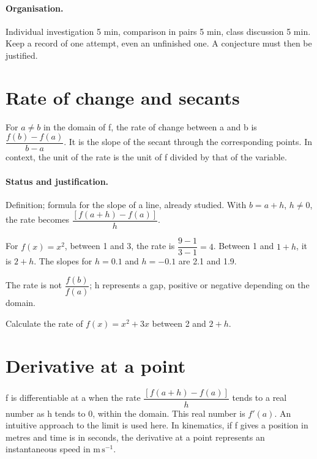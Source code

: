 \paragraph{Organisation.} Individual investigation 5 min, comparison in pairs 5 min, class discussion 5 min. Keep a record of one attempt, even an unfinished one. A conjecture must then be justified.
\mxnewpage
\section{Rate of change and secants}\label{C04-U1}
\begin{keypoint}
For $a\ne b$ in the domain of f, the rate of change between a and b is $\dfrac{f(b)-f(a)}{b-a}$. It is the slope of the secant through the corresponding points. In context, the unit of the rate is the unit of f divided by that of the variable.
\end{keypoint}
\paragraph{Status and justification.} Definition; formula for the slope of a line, already studied. With $b=a+h$, $h\ne0$, the rate becomes $\dfrac{[f(a+h)-f(a)]}{h}$.
\begin{example}For $f(x)=x^2$, between 1 and 3, the rate is $\dfrac{9-1}{3-1}=4$. Between 1 and $1+h$, it is $2+h$. The slopes for $h=\num{0,1}$ and $h=-\num{0,1}$ are \num{2,1} and \num{1,9}.\end{example}\label{C04-EX1}
\begin{pitfall}The rate is not $\dfrac{f(b)}{f(a)}$; h represents a gap, positive or negative depending on the domain.\end{pitfall}
\begin{application}Calculate the rate of $f(x)=x^2+3x$ between 2 and $2+h$.\end{application}\label{C04-AP1}
\section{Derivative at a point}\label{C04-U2}
\begin{keypoint}
f is differentiable at a when the rate $\dfrac{[f(a+h)-f(a)]}{h}$ tends to a real number as h tends to 0, within the domain. This real number is $f\prime(a)$. An intuitive approach to the limit is used here. In kinematics, if f gives a position in metres and time is in seconds, the derivative at a point represents an instantaneous speed in $\mathrm{m\,s^{-1}}$.
\end{keypoint}
